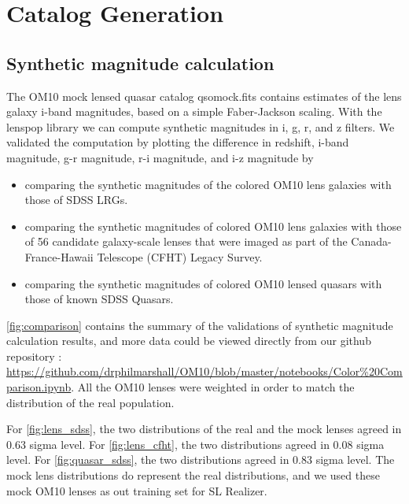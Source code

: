 \documentclass[\docopts]{\docclass}
\begin{document}


\section{Catalog Generation}
\subsection{Synthetic magnitude calculation}
\label{sssec:Synthetic}

The OM10 mock lensed quasar catalog qso\textunderscore mock.fits contains estimates of the lens galaxy i-band magnitudes, based on a simple Faber-Jackson scaling. With the lenspop library we can compute synthetic magnitudes in i, g, r, and z filters. We validated the computation by plotting the difference in redshift,  i-band magnitude, g-r magnitude, r-i magnitude, and i-z magnitude by

\begin{itemize}
  \item comparing the synthetic magnitudes of the colored OM10 lens galaxies with those of SDSS LRGs.
  \item comparing the synthetic magnitudes of colored OM10 lens galaxies with those of 56 candidate galaxy-scale lenses that were imaged as part of the Canada-France-Hawaii Telescope (CFHT) Legacy Survey.
  \item comparing the synthetic magnitudes of colored OM10 lensed quasars with those of known SDSS Quasars.
\end{itemize}

 \ref{fig:comparison} contains the summary of the validations of synthetic magnitude calculation results, and more data could be viewed directly from our github repository : \url{https://github.com/drphilmarshall/OM10/blob/master/notebooks/Color%20Comparison.ipynb}. All the OM10 lenses were weighted in order to match the distribution of the real population. 
 
 For \ref{fig:lens_sdss}, the two distributions of the real and the mock lenses agreed in 0.63 sigma level. For \ref{fig:lens_cfht}, the two distributions agreed in 0.08 sigma level. For \ref{fig:quasar_sdss}, the two distributions agreed in 0.83 sigma level. The mock lens distributions do represent the real distributions, and we used these mock OM10 lenses as out training set for SL Realizer.
 
\end{document}
